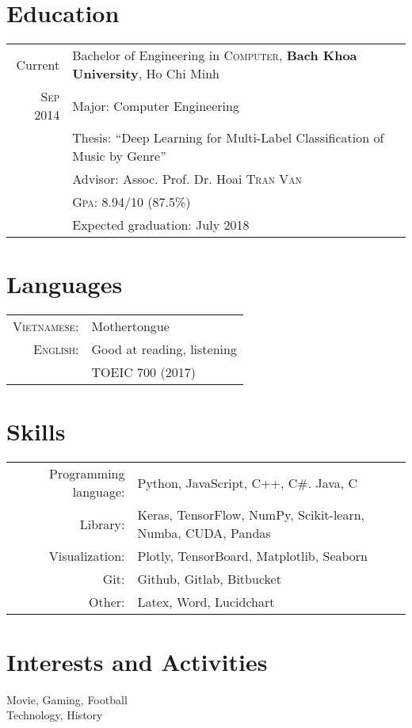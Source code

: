 \documentclass[a4paper,10pt]{article}
\begin{document}
\section{Education}
\begin{tabular}{r|l}
	Current           & Bachelor of Engineering in \textsc{Computer}, \textbf{Bach Khoa University}, Ho Chi Minh \\
	\textsc{Sep} 2014 & Major: Computer Engineering                                                              \\
	                  & Thesis: ``Deep Learning for Multi-Label Classification of Music by Genre''
	\\
	                  & \small Advisor: Assoc. Prof. Dr. Hoai \textsc{Tran Van}
	\\
	                  & \normalsize \textsc{Gpa}: 8.94/10 (87.5\%)                                               \\
	                  & Expected graduation: July 2018
\end{tabular}

\section{Languages}
\begin{tabular}{rl}
	\textsc{Vietnamese:} & Mothertongue               \\
	\textsc{English:}    & Good at reading, listening \\
	                     & TOEIC 700 (2017)           \\
\end{tabular}

\section{Skills}
\begin{tabular}{rp{11cm}}
	Programming language: & Python, JavaScript, C++, C\#. Java, C \\
	Library: & Keras, TensorFlow, NumPy, Scikit-learn, Numba, CUDA, Pandas \\	
	Visualization: & Plotly, TensorBoard, Matplotlib, Seaborn \\
	Git:        & Github, Gitlab, Bitbucket \\
	Other: 			& Latex, Word, Lucidchart \\
\end{tabular}

\section{Interests and Activities}
Movie, Gaming, Football \\
Technology, History\\
\end{document}
